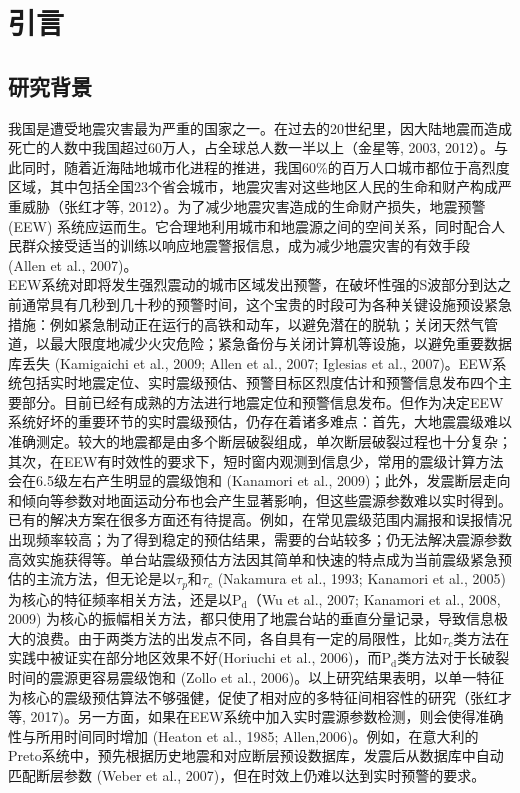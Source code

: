 
\chapter{引言}
\section{研究背景}
\indent 我国是遭受地震灾害最为严重的国家之一。在过去的20世纪里，因大陆地震而造成死亡的人数中我国超过60万人，占全球总人数一半以上（金星等, 2003, 2012）。与此同时，随着近海陆地城市化进程的推进，我国60\%的百万人口城市都位于高烈度区域，其中包括全国23个省会城市，地震灾害对这些地区人民的生命和财产构成严重威胁（张红才等, 2012）。为了减少地震灾害造成的生命财产损失，地震预警 (EEW) 系统应运而生。它合理地利用城市和地震源之间的空间关系，同时配合人民群众接受适当的训练以响应地震警报信息，成为减少地震灾害的有效手段 (Allen et al., 2007)。\\
 \indent EEW系统对即将发生强烈震动的城市区域发出预警，在破坏性强的S波部分到达之前通常具有几秒到几十秒的预警时间，这个宝贵的时段可为各种关键设施预设紧急措施：例如紧急制动正在运行的高铁和动车，以避免潜在的脱轨；关闭天然气管道，以最大限度地减少火灾危险；紧急备份与关闭计算机等设施，以避免重要数据库丢失 (Kamigaichi et al., 2009; Allen et al., 2007; Iglesias et al., 2007)。EEW系统包括实时地震定位、实时震级预估、预警目标区烈度估计和预警信息发布四个主要部分。目前已经有成熟的方法进行地震定位和预警信息发布。但作为决定EEW系统好坏的重要环节的实时震级预估，仍存在着诸多难点：首先，大地震震级难以准确测定。较大的地震都是由多个断层破裂组成，单次断层破裂过程也十分复杂；其次，在EEW有时效性的要求下，短时窗内观测到信息少，常用的震级计算方法会在6.5级左右产生明显的震级饱和 (Kanamori et al., 2009)；此外，发震断层走向和倾向等参数对地面运动分布也会产生显著影响，但这些震源参数难以实时得到。\\
 \indent 已有的解决方案在很多方面还有待提高。例如，在常见震级范围内漏报和误报情况出现频率较高；为了得到稳定的预估结果，需要的台站较多；仍无法解决震源参数高效实施获得等。单台站震级预估方法因其简单和快速的特点成为当前震级紧急预估的主流方法，但无论是以$\tau_{p}$和$\tau_{c}$ (Nakamura et al., 1993; Kanamori et al., 2005) 为核心的特征频率相关方法，还是以$\mathrm{P}_{\mathrm{d}}$（Wu et al., 2007; Kanamori et al., 2008, 2009) 为核心的振幅相关方法，都只使用了地震台站的垂直分量记录，导致信息极大的浪费。由于两类方法的出发点不同，各自具有一定的局限性，比如$\tau_{c}$类方法在实践中被证实在部分地区效果不好(Horiuchi et al., 2006)，而$\mathrm{P}_{\mathrm{d}}$类方法对于长破裂时间的震源更容易震级饱和 (Zollo et al., 2006)。以上研究结果表明，以单一特征为核心的震级预估算法不够强健，促使了相对应的多特征间相容性的研究（张红才等, 2017)。另一方面，如果在EEW系统中加入实时震源参数检测，则会使得准确性与所用时间同时增加 (Heaton et al., 1985; Allen,2006)。例如，在意大利的Preto系统中，预先根据历史地震和对应断层预设数据库，发震后从数据库中自动匹配断层参数 (Weber et al., 2007)，但在时效上仍难以达到实时预警的要求。\\
